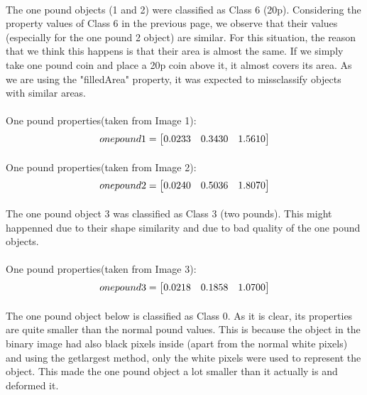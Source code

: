 \documentclass[11pt]{article}
\begin{document}
\paragraph{}
The one pound objects (1 and 2) were classified as Class 6 (20p). Considering the property values of Class 6 in the previous page, we observe that their values (especially for the one pound 2 object) are similar. For this situation, the reason that we think this happens is that their area is almost the same. If we simply take one pound coin and place a 20p coin above it, it almost covers its area. As we are using the "filledArea" property, it was expected to missclassify objects with similar areas.
\paragraph{}
One pound properties(taken from Image 1):
\[
one pound 1 = 
	\setcounter{MaxMatrixCols}{3}
	\begin{bmatrix}
	0.0233 & 0.3430 & 1.5610\\
	\end{bmatrix}
\]
\paragraph{}
One pound properties(taken from Image 2):
\[
one pound 2 = 
	\setcounter{MaxMatrixCols}{3}
	\begin{bmatrix}
	0.0240 & 0.5036 & 1.8070\\
	\end{bmatrix}
\]
\paragraph{}
The one pound object 3 was classified as Class 3 (two pounds). This might happenned due to their shape similarity and due to bad quality of the one pound objects.
\paragraph{}
One pound properties(taken from Image 3):
\[
one pound 3 = 
	\setcounter{MaxMatrixCols}{3}
	\begin{bmatrix}
	0.0218 & 0.1858 & 1.0700\\
	\end{bmatrix}
\]

\paragraph{}
The one pound object below is classified as Class 0. As it is clear, its properties are quite smaller than the normal pound values. This is because the object in the binary image had also black pixels inside (apart from the normal white pixels) and using the getlargest method, only the white pixels were used to represent the object. This made the one pound object a lot smaller than it actually is and deformed it.
\end{document}

